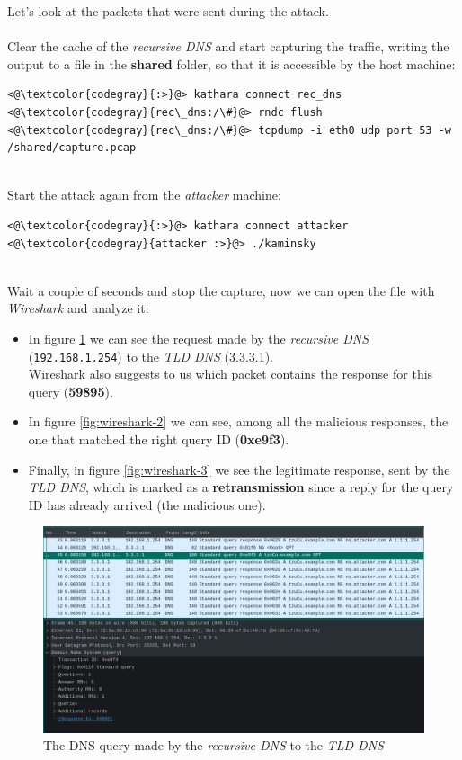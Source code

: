 \documentclass[11pt,a4paper]{article}
\begin{document}
Let's look at the packets that were sent during the attack.
\\
\\
\noindent
Clear the cache of the \emph{recursive DNS} and start capturing the traffic,
writing the output to a file in the \textbf{shared} folder,
so that it is accessible by the host machine:

\begin{lstlisting}
<@\textcolor{codegray}{:>}@> kathara connect rec_dns
<@\textcolor{codegray}{rec\_dns:/\#}@> rndc flush
<@\textcolor{codegray}{rec\_dns:/\#}@> tcpdump -i eth0 udp port 53 -w /shared/capture.pcap
\end{lstlisting}

\noindent
\\
Start the attack again from the \emph{attacker} machine:
\begin{lstlisting}
<@\textcolor{codegray}{:>}@> kathara connect attacker
<@\textcolor{codegray}{attacker :>}@> ./kaminsky
\end{lstlisting}

\noindent
\\
Wait a couple of seconds and stop the capture, now we can open the file with \emph{Wireshark}
and analyze it:

\begin{itemize}
  \item In figure \ref*{fig:wireshark-1} we can see the request made by the
        \emph{recursive DNS} (\texttt{192.168.1.254}) to the \emph{TLD DNS}
        (3.3.3.1).\\
        Wireshark also suggests to us which packet contains the response for
        this query (\textbf{59895}).
  \item In figure \ref{fig:wireshark-2} we can see, among all the malicious responses,
        the one that matched the right query ID (\textbf{0xe9f3}).
  \item Finally, in figure \ref{fig:wireshark-3} we see the legitimate response, sent by
        the \emph{TLD DNS}, which is marked as a \textbf{retransmission} since a reply
        for the query ID has already arrived (the malicious one).
\end{itemize}

\begin{figure}[h!]
  \includegraphics[width=\linewidth]{wireshark-1.png}
  \caption{The DNS query made by the \emph{recursive DNS} to the \emph{TLD DNS}}
  \label{fig:wireshark-1}
\end{figure}
\end{document}
